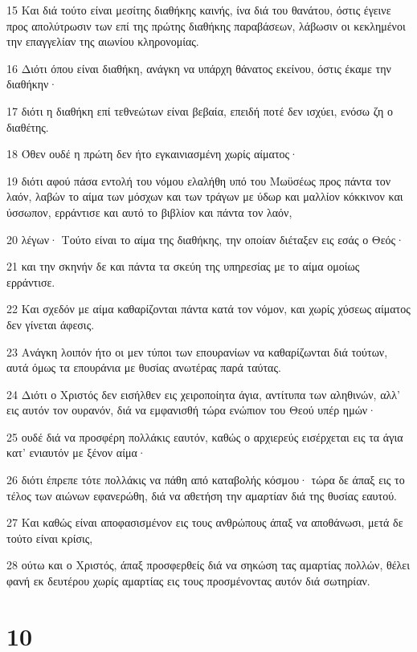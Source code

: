 \par 15 Και διά τούτο είναι μεσίτης διαθήκης καινής, ίνα διά του θανάτου, όστις έγεινε προς απολύτρωσιν των επί της πρώτης διαθήκης παραβάσεων, λάβωσιν οι κεκλημένοι την επαγγελίαν της αιωνίου κληρονομίας.
\par 16 Διότι όπου είναι διαθήκη, ανάγκη να υπάρχη θάνατος εκείνου, όστις έκαμε την διαθήκην·
\par 17 διότι η διαθήκη επί τεθνεώτων είναι βεβαία, επειδή ποτέ δεν ισχύει, ενόσω ζη ο διαθέτης.
\par 18 Όθεν ουδέ η πρώτη δεν ήτο εγκαινιασμένη χωρίς αίματος·
\par 19 διότι αφού πάσα εντολή του νόμου ελαλήθη υπό του Μωϋσέως προς πάντα τον λαόν, λαβών το αίμα των μόσχων και των τράγων με ύδωρ και μαλλίον κόκκινον και ύσσωπον, ερράντισε και αυτό το βιβλίον και πάντα τον λαόν,
\par 20 λέγων· Τούτο είναι το αίμα της διαθήκης, την οποίαν διέταξεν εις εσάς ο Θεός·
\par 21 και την σκηνήν δε και πάντα τα σκεύη της υπηρεσίας με το αίμα ομοίως ερράντισε.
\par 22 Και σχεδόν με αίμα καθαρίζονται πάντα κατά τον νόμον, και χωρίς χύσεως αίματος δεν γίνεται άφεσις.
\par 23 Ανάγκη λοιπόν ήτο οι μεν τύποι των επουρανίων να καθαρίζωνται διά τούτων, αυτά όμως τα επουράνια με θυσίας ανωτέρας παρά ταύτας.
\par 24 Διότι ο Χριστός δεν εισήλθεν εις χειροποίητα άγια, αντίτυπα των αληθινών, αλλ' εις αυτόν τον ουρανόν, διά να εμφανισθή τώρα ενώπιον του Θεού υπέρ ημών·
\par 25 ουδέ διά να προσφέρη πολλάκις εαυτόν, καθώς ο αρχιερεύς εισέρχεται εις τα άγια κατ' ενιαυτόν με ξένον αίμα·
\par 26 διότι έπρεπε τότε πολλάκις να πάθη από καταβολής κόσμου· τώρα δε άπαξ εις το τέλος των αιώνων εφανερώθη, διά να αθετήση την αμαρτίαν διά της θυσίας εαυτού.
\par 27 Και καθώς είναι αποφασισμένον εις τους ανθρώπους άπαξ να αποθάνωσι, μετά δε τούτο είναι κρίσις,
\par 28 ούτω και ο Χριστός, άπαξ προσφερθείς διά να σηκώση τας αμαρτίας πολλών, θέλει φανή εκ δευτέρου χωρίς αμαρτίας εις τους προσμένοντας αυτόν διά σωτηρίαν.

\chapter{10}

